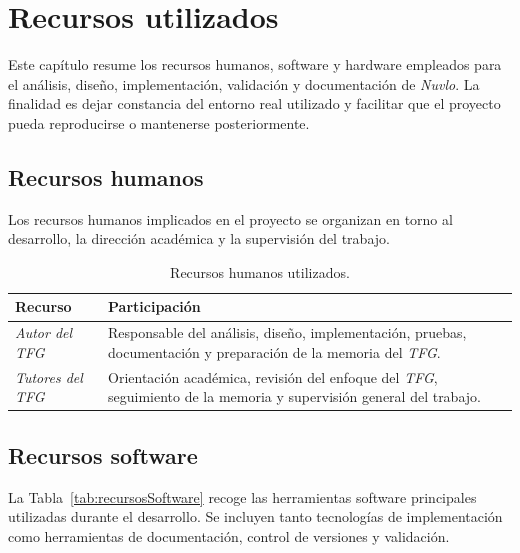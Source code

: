 \chapter{Recursos utilizados}
\label{recursosUtilizados}

Este capítulo resume los recursos humanos, software y hardware empleados para el análisis, diseño, implementación, validación y documentación de \textit{Nuvlo}. La finalidad es dejar constancia del entorno real utilizado y facilitar que el proyecto pueda reproducirse o mantenerse posteriormente.

\section{Recursos humanos}

Los recursos humanos implicados en el proyecto se organizan en torno al desarrollo, la dirección académica y la supervisión del trabajo.

\begin{table}[htbp]
\centering
\small
\begin{tabularx}{\textwidth}{p{} X}
\toprule
\textbf{Recurso} & \textbf{Participación} \\
\midrule
\textit{Autor del TFG} & Responsable del análisis, diseño, implementación, pruebas, documentación y preparación de la memoria del \textit{TFG}. \\
\midrule
\textit{Tutores del TFG} & Orientación académica, revisión del enfoque del \textit{TFG}, seguimiento de la memoria y supervisión general del trabajo. \\
\bottomrule
\end{tabularx}
\caption{Recursos humanos utilizados.}
\label{tab:recursosHumanos}
\end{table}

\section{Recursos software}

La Tabla~\ref{tab:recursosSoftware} recoge las herramientas software principales utilizadas durante el desarrollo. Se incluyen tanto tecnologías de implementación como herramientas de documentación, control de versiones y validación.

